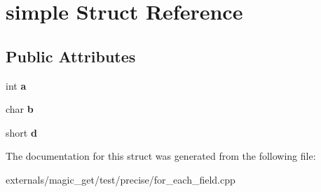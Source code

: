 \hypertarget{structsimple}{}\section{simple Struct Reference}
\label{structsimple}
\subsection*{Public Attributes}
\begin{DoxyCompactItemize}
\item 
\mbox{\label{structsimple_a70e2b00f2bebc3a8b900779b97c077ef}} 
int {\bfseries a}
\item 
\mbox{\label{structsimple_a41a2e9c9e16f81402e0819cae63e979c}} 
char {\bfseries b}
\item 
\mbox{\label{structsimple_a594ce316e968d68e6cee288f44450d87}} 
short {\bfseries d}
\end{DoxyCompactItemize}


The documentation for this struct was generated from the following file\+:\begin{DoxyCompactItemize}
\item 
externals/magic\+\_\+get/test/precise/for\+\_\+each\+\_\+field.\+cpp\end{DoxyCompactItemize}
